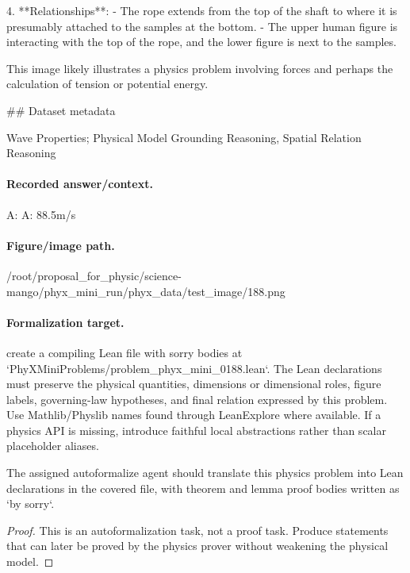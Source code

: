 4. **Relationships**:
   - The rope extends from the top of the shaft to where it is presumably attached to the samples at the bottom.
   - The upper human figure is interacting with the top of the rope, and the lower figure is next to the samples.

This image likely illustrates a physics problem involving forces and perhaps the calculation of tension or potential energy.

\#\# Dataset metadata

Wave Properties; Physical Model Grounding Reasoning, Spatial Relation Reasoning

\paragraph{Recorded answer/context.}
A: A: 88.5m/s

\paragraph{Figure/image path.}
/root/proposal\_for\_physic/science-mango/phyx\_mini\_run/phyx\_data/test\_image/188.png

\paragraph{Formalization target.}
create a compiling Lean file with sorry bodies at `PhyXMiniProblems/problem\_phyx\_mini\_0188.lean`. The Lean declarations must preserve the physical quantities, dimensions or dimensional roles, figure labels, governing-law hypotheses, and final relation expressed by this problem.
Use Mathlib/Physlib names found through LeanExplore where available. If a physics API is missing, introduce faithful local abstractions rather than scalar placeholder aliases.

\begin{theorem}
\label{thm:physics:phyx_mini_0188:target}
The assigned autoformalize agent should translate this physics problem into Lean declarations in the covered file, with theorem and lemma proof bodies written as `by sorry`.
\end{theorem}
\begin{proof}
This is an autoformalization task, not a proof task. Produce statements that can later be proved by the physics prover without weakening the physical model.
\end{proof}


